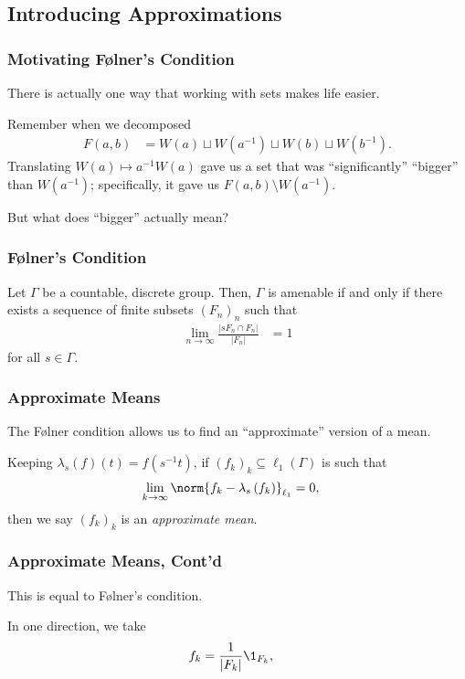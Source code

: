 \documentclass{beamer-custom}
\begin{document}
\subsection{Introducing Approximations}%
\begin{frame}
  \frametitle{Motivating Følner's Condition}
  There is actually one way that working with sets makes life easier.\pause\newline

  Remember when we decomposed
  \begin{align*}
    F(a,b) &= W(a) \sqcup W\left( a^{-1} \right) \sqcup W\left( b \right) \sqcup W\left( b^{-1} \right).
  \end{align*}
  Translating $W\left( a \right) \mapsto a^{-1}W\left( a \right)$ gave us a set that was ``significantly'' ``bigger'' than $W\left( a^{-1} \right)$; specifically, it gave us $F\left( a,b \right) \setminus W\left( a^{-1} \right)$.\pause\newline

  But what does ``bigger'' actually mean?
\end{frame}
\begin{frame}
  \frametitle{Følner's Condition}
  \begin{theorem}
    Let $\Gamma$ be a countable, discrete group. Then, $\Gamma$ is amenable if and only if there exists a sequence of finite subsets $\left( F_n \right)_n$ such that
    \begin{align*}
      \lim_{n\rightarrow\infty} \frac{\left\vert sF_n \cap F_n \right\vert}{\left\vert F_n \right\vert} &= 1
    \end{align*}
    for all $s\in\Gamma$.
  \end{theorem}
\end{frame}
\begin{frame}
  \frametitle{Approximate Means}
  The Følner condition allows us to find an ``approximate'' version of a mean.\pause\newline

  Keeping $\lambda_s(f)(t) = f\left( s^{-1}t \right)$, if $\left( f_k \right)_k\subseteq \ell_1\left( \Gamma \right)$ is such that
  \begin{align*}
    \lim_{k\rightarrow\infty}\norm{f_k - \lambda_s\left( f_k \right)}_{\ell_1} &= 0,
  \end{align*}
  then we say $\left( f_k \right)_k$ is an \textit{approximate mean}.
  \end{frame}
  \begin{frame}
  \frametitle{Approximate Means, Cont'd}
  This is equal to Følner's condition.\newline

  In one direction, we take
  \begin{align*}
    f_k &= \frac{1}{\left\vert F_k \right\vert}\1_{F_k},
  \end{align*}
\end{frame}
\end{document}
